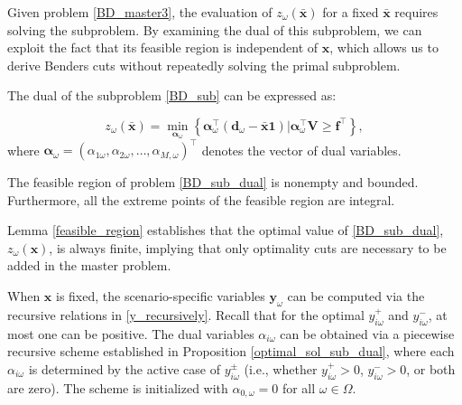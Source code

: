 Given problem \eqref{BD_master3}, the evaluation of $z_{\omega}(\mathbf{\bar{x}})$ for a fixed $\mathbf{\bar{x}}$ requires solving the subproblem. By examining the dual of this subproblem, we can exploit the fact that its feasible region is independent of $\mathbf{x}$, which allows us to derive Benders cuts without repeatedly solving the primal subproblem. 







The dual of the subproblem \eqref{BD_sub} can be expressed as:

\begin{equation}\label{BD_sub_dual}
  z_{\omega}(\mathbf{\bar{x}}) = \min_{\bm{\alpha}_{\omega}} \left\{
    \bm{\alpha}_{\omega}^{\intercal} (\mathbf{d}_{\omega}- \mathbf{\bar{x}} \mathbf{1})\Big| \bm{\alpha}_{\omega}^{\intercal} \mathbf{V} \geq \mathbf{f}^{\intercal}
  \right\},
\end{equation}
where $\bm{\alpha}_{\omega} = (\alpha_{1\omega},\alpha_{2\omega}, \ldots, \alpha_{M,\omega})^{\intercal}$ denotes the vector of dual variables. 

\begin{lem}\label{feasible_region}
  The feasible region of problem \eqref{BD_sub_dual} is nonempty and bounded. Furthermore, all the extreme points of the feasible region are integral.
 \end{lem}
 
Lemma \ref{feasible_region} establishes that the optimal value of \eqref{BD_sub_dual}, $z_{\omega}(\mathbf{x})$, is always finite, implying that only optimality cuts are necessary to be added in the master problem.

When $\mathbf{x}$ is fixed, the scenario-specific variables $\mathbf{y}_{\omega}$ can be computed via the recursive relations in \eqref{y_recursively}. Recall that for the optimal $y_{i \omega}^{+}$ and $y_{i \omega}^{-}$, at most one can be positive. The dual variables $\alpha_{i \omega}$ can be obtained via a piecewise recursive scheme established in Proposition \ref{optimal_sol_sub_dual}, where each $\alpha_{i \omega}$ is determined by the active case of $y_{i \omega}^{\pm}$ (i.e., whether $y_{i \omega}^{+}>0$, $y_{i \omega}^{-}>0$, or both are zero). The scheme is initialized with $\alpha_{0, \omega} = 0$ for all $\omega \in \Omega$.
 

